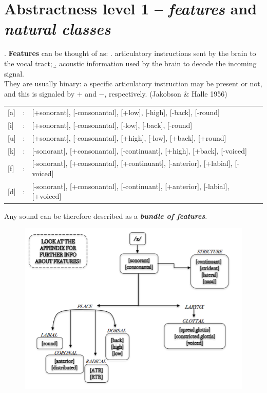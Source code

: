\documentclass[11pt, oneside]{article}   	%
\begin{document}
\newpage

\section{Abstractness level 1 -- {\itshape features} and {\itshape natural classes}}

\ex. {\bfseries Features} can be thought of as:
\a. articulatory instructions sent by the brain to the vocal tract;
\b. acoustic information used by the brain to decode the incoming signal. \\
They are usually binary: a specific articulatory instruction may be present or not, and this is signaled by $+$ and $-$, respectively. (Jakobson \& Halle 1956)

\begin{center}
\begin{tabular}{l c l}
{[a]} & : & [+sonorant], [-consonantal], [+low], [-high], [-back], [-round] \\
{[i]} & : & [+sonorant], [-consonantal], [-low], [-back], [-round] \\
{[u]} & : & [+sonorant], [-consonantal], [+high], [-low], [+back], [+round] \\ \hline
{[k]} & : & [-sonorant], [+consonantal], [-continuant], [+high], [+back], [-voiced] \\
{[f]} & : & [-sonorant], [+consonantal], [+continuant], [-anterior], [+labial], [-voiced] \\
{[d]} & : & [-sonorant], [+consonantal], [-continuant], [+anterior], [-labial], [+voiced] \\
\end{tabular}
\end{center}

Any sound can be therefore described as a {\itshape \bfseries bundle of features}.

\begin{figure}[h!]
\centering
\includegraphics[scale=0.75]{features_tree}
\end{figure}
\end{document}
